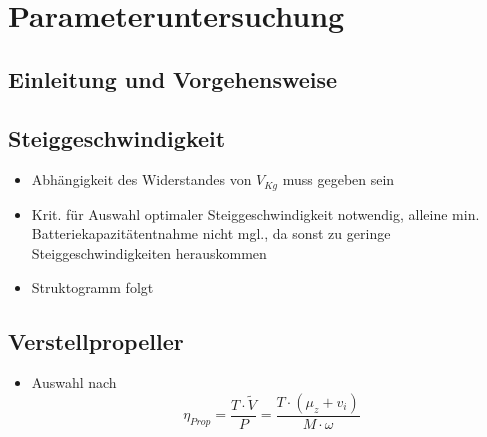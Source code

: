 \chapter{Parameteruntersuchung}
\label{chap:parameteruntersuchung}

\section{Einleitung und Vorgehensweise}
\label{sec:einleitung_und_vorgehensweise}

\section{Steiggeschwindigkeit}
\label{sec:steiggeschwindigkeit}

\begin{itemize}
	\item Abhängigkeit des Widerstandes von \ensuremath{V_{Kg}} muss gegeben sein
	\item Krit. für Auswahl optimaler Steiggeschwindigkeit notwendig, alleine min. Batteriekapazitätentnahme nicht mgl., da sonst zu geringe Steiggeschwindigkeiten herauskommen
	\item Struktogramm folgt
\end{itemize}

\section{Verstellpropeller}
\label{sec:verstellprop}

\begin{itemize}
	\item Auswahl nach 
	\begin{equation}
		\eta_{Prop} = \frac{T\cdot\tilde{V}}{P} = \frac{T\cdot (\mu_z + v_i)}{M\cdot \omega}
	\end{equation}
\end{itemize}

